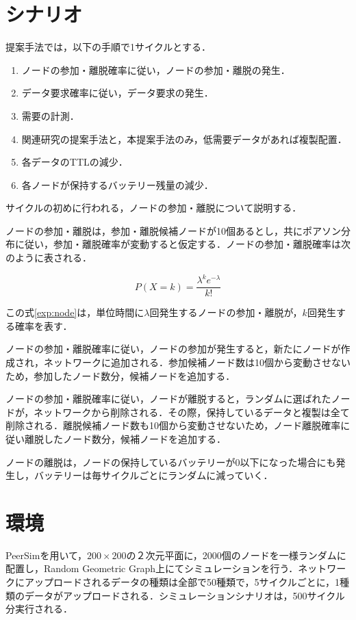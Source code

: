 \documentclass[11pt]{jreport}
\begin{document}
\section{シナリオ}
提案手法では，以下の手順で1サイクルとする．

\begin{enumerate}
	\item ノードの参加・離脱確率に従い，ノードの参加・離脱の発生．
	\item データ要求確率に従い，データ要求の発生．
	\item 需要の計測．
	\item 関連研究の提案手法と，本提案手法のみ，低需要データがあれば複製配置．
	\item 各データのTTLの減少．
	\item 各ノードが保持するバッテリー残量の減少．
\end{enumerate}

サイクルの初めに行われる，ノードの参加・離脱について説明する．
\par ノードの参加・離脱は，参加・離脱候補ノードが10個あるとし，共にポアソン分布に従い，参加・離脱確率が変動すると仮定する．ノードの参加・離脱確率は次のように表される．

\begin{equation}
P(X=k)=\frac{\lambda^{k}e^{-\lambda}}{k!} \label{exp:node}
\end{equation}

この式\ref{exp:node}は，単位時間に$\lambda$回発生するノードの参加・離脱が，$k$回発生する確率を表す．
\par ノードの参加・離脱確率に従い，ノードの参加が発生すると，新たにノードが作成され，ネットワークに追加される．参加候補ノード数は10個から変動させないため，参加したノード数分，候補ノードを追加する．
\par ノードの参加・離脱確率に従い，ノードが離脱すると，ランダムに選ばれたノードが，ネットワークから削除される．その際，保持しているデータと複製は全て削除される．離脱候補ノード数も10個から変動させないため，ノード離脱確率に従い離脱したノード数分，候補ノードを追加する．
\par ノードの離脱は，ノードの保持しているバッテリーが0以下になった場合にも発生し，バッテリーは毎サイクルごとにランダムに減っていく．

\section{環境}
PeerSimを用いて，$200 \times 200$の２次元平面に，2000個のノードを一様ランダムに配置し，Random Geometric Graph上にてシミュレーションを行う．ネットワークにアップロードされるデータの種類は全部で50種類で，5サイクルごとに，1種類のデータがアップロードされる．シミュレーションシナリオは，500サイクル分実行される．
\end{document}
